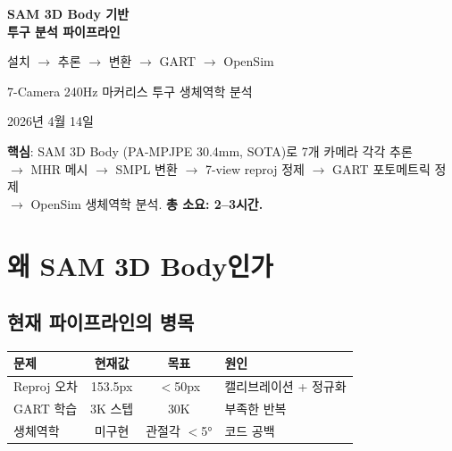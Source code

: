 \documentclass[11pt, a4paper]{report}
\begin{document}
\begin{titlepage}
\centering
\vspace*{2cm}
{\Huge\bfseries\color{defblue} SAM 3D Body 기반\\[0.3cm] 투구 분석 파이프라인}

\vspace{1cm}
{\LARGE\color{defblue!70!black} 설치 $\to$ 추론 $\to$ 변환 $\to$ GART $\to$ OpenSim}

\vspace{2cm}
{\large 7-Camera 240Hz 마커리스 투구 생체역학 분석}

\vspace{1cm}
{\large 2026년 4월 14일}

\vspace{3cm}
\begin{tcolorbox}[colback=lightblue, colframe=defblue, width=0.85\textwidth]
\textbf{핵심}: SAM 3D Body (PA-MPJPE 30.4mm, SOTA)로 7개 카메라 각각 추론\\
$\to$ MHR 메시 $\to$ SMPL 변환 $\to$ 7-view reproj 정제 $\to$ GART 포토메트릭 정제\\
$\to$ OpenSim 생체역학 분석. \textbf{총 소요: 2--3시간.}
\end{tcolorbox}
\end{titlepage}

\tableofcontents
\newpage


\chapter{왜 SAM 3D Body인가}

\section{현재 파이프라인의 병목}

\begin{center}
\renewcommand{\arraystretch}{1.3}
\begin{tabular}{lccl}
\toprule
\textbf{문제} & \textbf{현재값} & \textbf{목표} & \textbf{원인} \\
\midrule
Reproj 오차 & 153.5px & $<$50px & 캘리브레이션 + 정규화 \\
GART 학습 & 3K 스텝 & 30K & 부족한 반복 \\
생체역학 & 미구현 & 관절각 $<$5° & 코드 공백 \\
\bottomrule
\end{tabular}
\end{center}
\end{document}
